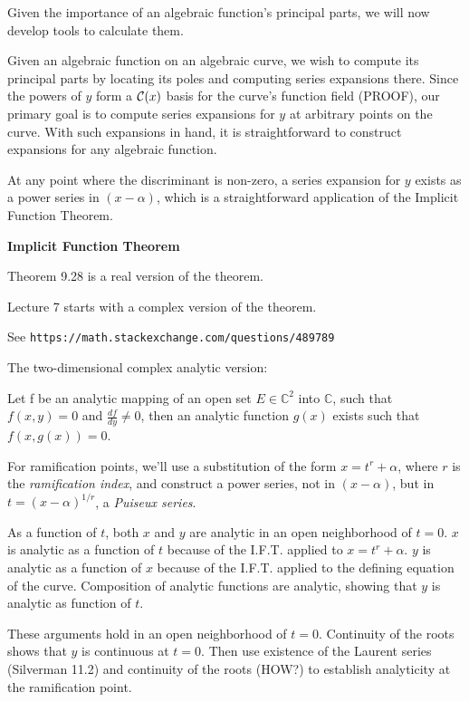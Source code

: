 \endtheorem

Given the importance of an algebraic function's principal parts, we will
now develop tools to calculate them.

\vfill\eject


Given an algebraic function on an algebraic curve, we wish to compute
its principal parts by locating its poles and computing series
expansions there.  Since the powers of $y$ form a ${\cal C}(x)$ basis
for the curve's function field (PROOF), our primary goal is to compute
series expansions for $y$ at arbitrary points on the curve.  With such
expansions in hand, it is straightforward to construct expansions for
any algebraic function.

At any point where the discriminant is non-zero, a series expansion
for $y$ exists as a power series in $(x-\alpha)$, which is a
straightforward application of the Implicit Function Theorem.

\theorem
{\bf Implicit Function Theorem}
\label{implicit function theorem}

\cite{baby rudin} Theorem 9.28 is a real version of the theorem.

\cite{guillemin} Lecture 7 starts with a complex version of the theorem.

See {\tt https://math.stackexchange.com/questions/489789}

The two-dimensional complex analytic version:

Let f be an analytic
mapping of an open set $E \in {\mathbb C}^2$ into ${\mathbb C}$, such
that $f(x,y)=0$ and $\frac{df}{dy} \ne 0$, then an analytic
function $g(x)$ exists such that $f(x,g(x))=0$.
\endtheorem


For ramification points, we'll use a substitution of the form
$x=t^r+\alpha$, where $r$ is the {\it ramification index}, and
construct a power series, not in $(x-\alpha)$, but in
$t=(x-\alpha)^{1/r}$, a {\it Puiseux series}.

As a function of $t$, both $x$ and $y$ are analytic in an open
neighborhood of $t=0$.  $x$ is analytic as a function of $t$ because
of the I.F.T. applied to $x=t^r+\alpha$.  $y$ is analytic as a
function of $x$ because of the I.F.T. applied to the defining equation
of the curve.  Composition of analytic functions are analytic,
showing that $y$ is analytic as function of $t$.

These arguments hold in an open neighborhood of $t=0$.  Continuity of
the roots shows that $y$ is continuous at $t=0$.  Then use existence
of the Laurent series (Silverman 11.2) and continuity of the roots
(HOW?) to establish analyticity at the ramification point.

